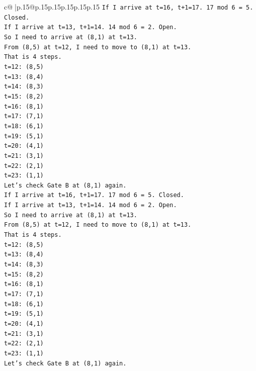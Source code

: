 \documentclass{article}
\begin{document}
{\begin{supertabular}{c@{$\;$}|p{.15\linewidth}@{}p{.15\linewidth}p{.15\linewidth}p{.15\linewidth}p{.15\linewidth}p{.15\linewidth}}
{{{\texttt{If I arrive at t=16, t+1=17. 17 mod 6 = 5. Closed.} \\
\texttt{If I arrive at t=13, t+1=14. 14 mod 6 = 2. Open.} \\
\texttt{So I need to arrive at (8,1) at t=13.} \\
\texttt{From (8,5) at t=12, I need to move to (8,1) at t=13.} \\
\texttt{That is 4 steps.} \\
\texttt{t=12: (8,5)} \\
\texttt{t=13: (8,4)} \\
\texttt{t=14: (8,3)} \\
\texttt{t=15: (8,2)} \\
\texttt{t=16: (8,1)} \\
\texttt{t=17: (7,1)} \\
\texttt{t=18: (6,1)} \\
\texttt{t=19: (5,1)} \\
\texttt{t=20: (4,1)} \\
\texttt{t=21: (3,1)} \\
\texttt{t=22: (2,1)} \\
\texttt{t=23: (1,1)} \\
\texttt{Let's check Gate B at (8,1) again.} \\
\texttt{If I arrive at t=16, t+1=17. 17 mod 6 = 5. Closed.} \\
\texttt{If I arrive at t=13, t+1=14. 14 mod 6 = 2. Open.} \\
\texttt{So I need to arrive at (8,1) at t=13.} \\
\texttt{From (8,5) at t=12, I need to move to (8,1) at t=13.} \\
\texttt{That is 4 steps.} \\
\texttt{t=12: (8,5)} \\
\texttt{t=13: (8,4)} \\
\texttt{t=14: (8,3)} \\
\texttt{t=15: (8,2)} \\
\texttt{t=16: (8,1)} \\
\texttt{t=17: (7,1)} \\
\texttt{t=18: (6,1)} \\
\texttt{t=19: (5,1)} \\
\texttt{t=20: (4,1)} \\
\texttt{t=21: (3,1)} \\
\texttt{t=22: (2,1)} \\
\texttt{t=23: (1,1)} \\
\texttt{Let's check Gate B at (8,1) again.} \\
}}}
\end{supertabular}}
\end{document}
